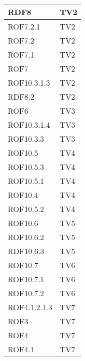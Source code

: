 \begin{center}
\begin{longtable}{|p{7cm}|p{7cm}|}
\midrule
RDF8
& TV2\\

\midrule
ROF7.2.1
& TV2\\

\midrule
ROF7.2
& TV2\\

\midrule
ROF7.1
& TV2\\

\midrule
ROF7
& TV2\\

\midrule
ROF10.3.1.3
& TV2\\

\midrule
RDF8.2
& TV2\\

\midrule
ROF6
& TV3\\

\midrule
ROF10.3.1.4
& TV3\\

\midrule
ROF10.3.3
& TV3\\

\midrule
ROF10.5
& TV4\\

\midrule
ROF10.5.3
& TV4\\

\midrule
ROF10.5.1
& TV4\\

\midrule
ROF10.4
& TV4\\

\midrule
ROF10.5.2
& TV4\\

\midrule
ROF10.6
& TV5\\

\midrule
ROF10.6.2
& TV5\\

\midrule
RDF10.6.3
& TV5\\

\midrule
ROF10.7
& TV6\\

\midrule
ROF10.7.1
& TV6\\

\midrule
ROF10.7.2
& TV6\\

\midrule
ROF4.1.2.1.3
& TV7\\

\midrule
ROF3
& TV7\\

\midrule
ROF4
& TV7\\

\midrule
ROF4.1
& TV7\\


\end{longtable}
\end{center}
